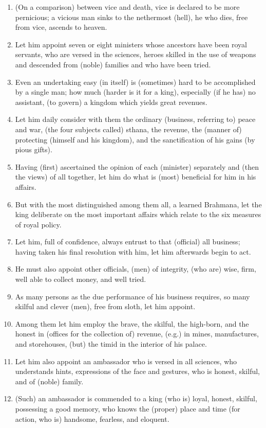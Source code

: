 \begin{enumerate}
\item (On a comparison) between vice and death, vice is declared to be more pernicious; a vicious man sinks to the nethermost (hell), he who dies, free from vice, ascends to heaven.
\item Let him appoint seven or eight ministers whose ancestors have been royal servants, who are versed in the sciences, heroes skilled in the use of weapons and descended from (noble) families and who have been tried.
\item Even an undertaking easy (in itself) is (sometimes) hard to be accomplished by a single man; how much (harder is it for a king), especially (if he has) no assistant, (to govern) a kingdom which yields great revenues.
\item Let him daily consider with them the ordinary (business, referring to) peace and war, (the four subjects called) sthana, the revenue, the (manner of) protecting (himself and his kingdom), and the sanctification of his gains (by pious gifts).
\item Having (first) ascertained the opinion of each (minister) separately and (then the views) of all together, let him do what is (most) beneficial for him in his affairs.
\item But with the most distinguished among them all, a learned Brahmana, let the king deliberate on the most important affairs which relate to the six measures of royal policy.
\item Let him, full of confidence, always entrust to that (official) all business; having taken his final resolution with him, let him afterwards begin to act.
\item He must also appoint other officials, (men) of integrity, (who are) wise, firm, well able to collect money, and well tried.
\item As many persons as the due performance of his business requires, so many skilful and clever (men), free from sloth, let him appoint.
\item Among them let him employ the brave, the skilful, the high-born, and the honest in (offices for the collection of) revenue, (e.g.) in mines, manufactures, and storehouses, (but) the timid in the interior of his palace.
\item Let him also appoint an ambassador who is versed in all sciences, who understands hints, expressions of the face and gestures, who is honest, skilful, and of (noble) family.
\item (Such) an ambassador is commended to a king (who is) loyal, honest, skilful, possessing a good memory, who knows the (proper) place and time (for action, who is) handsome, fearless, and eloquent.

\end{enumerate}
